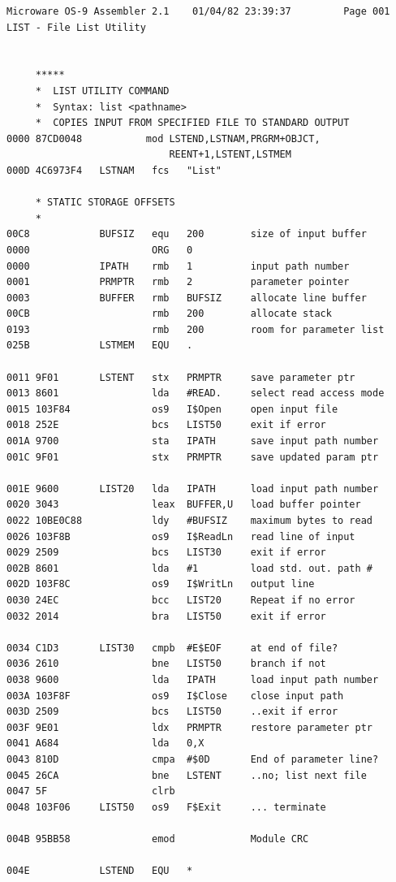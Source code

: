 \documentclass[
]{article}
\begin{document}
\begin{verbatim}
Microware OS-9 Assembler 2.1    01/04/82 23:39:37         Page 001
LIST - File List Utility


     *****
     *  LIST UTILITY COMMAND
     *  Syntax: list <pathname> 
     *  COPIES INPUT FROM SPECIFIED FILE TO STANDARD OUTPUT 
0000 87CD0048           mod LSTEND,LSTNAM,PRGRM+OBJCT,
                            REENT+1,LSTENT,LSTMEM
000D 4C6973F4   LSTNAM   fcs   "List"

     * STATIC STORAGE OFFSETS 
     *
00C8            BUFSIZ   equ   200        size of input buffer
0000                     ORG   0
0000            IPATH    rmb   1          input path number
0001            PRMPTR   rmb   2          parameter pointer
0003            BUFFER   rmb   BUFSIZ     allocate line buffer
00CB                     rmb   200        allocate stack
0193                     rmb   200        room for parameter list
025B            LSTMEM   EQU   .

0011 9F01       LSTENT   stx   PRMPTR     save parameter ptr
0013 8601                lda   #READ.     select read access mode
0015 103F84              os9   I$Open     open input file
0018 252E                bcs   LIST50     exit if error
001A 9700                sta   IPATH      save input path number
001C 9F01                stx   PRMPTR     save updated param ptr

001E 9600       LIST20   lda   IPATH      load input path number
0020 3043                leax  BUFFER,U   load buffer pointer
0022 10BE0C88            ldy   #BUFSIZ    maximum bytes to read
0026 103F8B              os9   I$ReadLn   read line of input
0029 2509                bcs   LIST30     exit if error
002B 8601                lda   #1         load std. out. path #
002D 103F8C              os9   I$WritLn   output line
0030 24EC                bcc   LIST20     Repeat if no error
0032 2014                bra   LIST50     exit if error

0034 C1D3       LIST30   cmpb  #E$EOF     at end of file?
0036 2610                bne   LIST50     branch if not
0038 9600                lda   IPATH      load input path number
003A 103F8F              os9   I$Close    close input path
003D 2509                bcs   LIST50     ..exit if error
003F 9E01                ldx   PRMPTR     restore parameter ptr
0041 A684                lda   0,X
0043 810D                cmpa  #$0D       End of parameter line?
0045 26CA                bne   LSTENT     ..no; list next file
0047 5F                  clrb
0048 103F06     LIST50   os9   F$Exit     ... terminate

004B 95BB58              emod             Module CRC

004E            LSTEND   EQU   *
\end{verbatim}
\end{document}
